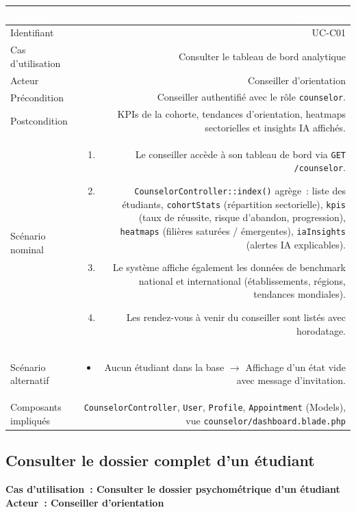 \documentclass[a4paper,12pt]{article}
\newcommand{\ucheader}[2]{%
  \noindent\colorbox{capblue}{\parbox{\dimexpr\linewidth-2\fboxsep}{%
    \color{white}\bfseries\large Cas d'utilisation~: #1 \hfill \normalsize Acteur~: #2
  }}\\[2pt]
}
\begin{document}
\noindent
\begin{tabular}{|L|R|}
\hline
{}\textcolor{white}{\textbf{Champ}} & \textcolor{white}{\textbf{Description}} \\
\hline
{}Identifiant & UC-C01 \\
\hline
Cas d'utilisation & Consulter le tableau de bord analytique \\
\hline
{}Acteur & Conseiller d'orientation \\
\hline
Précondition & Conseiller authentifié avec le rôle \texttt{counselor}. \\
\hline
{}Postcondition & KPIs de la cohorte, tendances d'orientation, heatmaps sectorielles et insights IA affichés. \\
\hline
Scénario nominal &
\begin{enumerate}
  \item Le conseiller accède à son tableau de bord via \texttt{GET /counselor}.
  \item \texttt{CounselorController::index()} agrège~: liste des étudiants, \texttt{cohortStats} (répartition sectorielle), \texttt{kpis} (taux de réussite, risque d'abandon, progression), \texttt{heatmaps} (filières saturées / émergentes), \texttt{iaInsights} (alertes IA explicables).
  \item Le système affiche également les données de benchmark national et international (établissements, régions, tendances mondiales).
  \item Les rendez-vous à venir du conseiller sont listés avec horodatage.
\end{enumerate} \\
\hline
{}Scénario alternatif &
\begin{itemize}
  \item Aucun étudiant dans la base $\rightarrow$ Affichage d'un état vide avec message d'invitation.
\end{itemize} \\
\hline
Composants impliqués & \texttt{CounselorController}, \texttt{User}, \texttt{Profile}, \texttt{Appointment} (Models), vue \texttt{counselor/dashboard.blade.php} \\
\hline
\end{tabular}

\vspace{1em}

\subsection{Consulter le dossier complet d'un étudiant}
\ucheader{Consulter le dossier psychométrique d'un étudiant}{Conseiller d'orientation}
\end{document}
